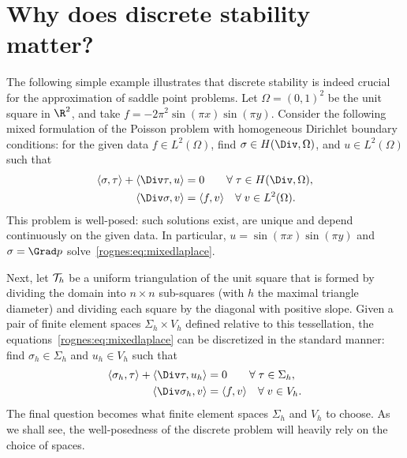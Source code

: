 \section{Why does discrete stability matter?}
\label{rognes:sec:motivation}

The following simple example illustrates that discrete stability is
indeed crucial for the approximation of saddle point problems. Let
$\Omega = (0, 1)^2$ be the unit square in $\R^2$, and take $f = - 2
\pi^2 \sin(\pi x) \sin(\pi y)$. Consider the following mixed
formulation of the Poisson problem with homogeneous Dirichlet boundary
conditions: for the given data $f \in L^2(\Omega)$, find $\sigma \in
H(\Div, \Omega)$, and $u \in L^2(\Omega)$ such that
\begin{equation}
  \label{rognes:eq:mixedlaplace}
  \begin{split}
    \langle \sigma, \tau \rangle + \langle \Div \tau, u \rangle &= 0
    \quad\quad \rognesforalls \tau \in H(\Div, \Omega), \\
    \langle \Div \sigma, v \rangle &= \langle f, v \rangle
    \quad \rognesforalls v \in L^2(\Omega).
  \end{split}
\end{equation}
This problem is well-posed: such solutions exist, are unique and
depend continuously on the given data. In particular, $u = \sin(\pi x)
\sin(\pi y)$ and $\sigma = \Grad p$
solve~\eqref{rognes:eq:mixedlaplace}.

Next, let $\mathcal{T}_h$ be a uniform triangulation of the unit
square that is formed by dividing the domain into $n \times n$
sub-squares (with $h$ the maximal triangle diameter) and dividing each
square by the diagonal with positive slope. Given a pair of finite
element spaces $\Sigma_h \times V_h$ defined relative to this
tessellation, the equations~\eqref{rognes:eq:mixedlaplace} can be
discretized in the standard manner: find $\sigma_h \in \Sigma_h$ and
$u_h \in V_h$ such that
\begin{equation}
  \label{rognes:eq:mixedlaplace:discrete}
  \begin{split}
    \langle \sigma_h, \tau \rangle + \langle \Div \tau, u_h \rangle &= 0
    \quad\quad \rognesforalls \tau \in \Sigma_h, \\
    \langle \Div \sigma_h, v \rangle &= \langle f, v \rangle
    \quad \rognesforalls v \in V_h.
  \end{split}
\end{equation}
The final question becomes what finite element spaces $\Sigma_h$ and
$V_h$ to choose. As we shall see, the well-posedness of the discrete
problem will heavily rely on the choice of spaces.

